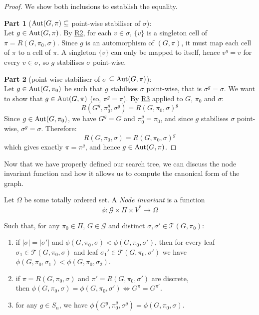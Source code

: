 \vspace{-0.7em}
  \begin{proof}
    We show both inclusions to establish the equality.

    \textbf{Part 1} ($\operatorname{Aut}(G, \pi) \subseteq$ point-wise stabiliser of $\sigma$):\\
    Let $g \in \operatorname{Aut}(G, \pi)$. By \hyperref[RefinementRule:singleton]{R2}, for each $v \in \sigma$, $\{v\}$ is a singleton
    cell of $\pi = R(G, \pi_0, \sigma)$. Since $g$ is an automorphism of $(G, \pi)$, it must
    map each cell of $\pi$ to a cell of $\pi$. A singleton $\{v\}$ can only be mapped to
    itself, hence $v^g = v$ for every $v \in \sigma$, so $g$ stabilises $\sigma$ point-wise.
    
    \textbf{Part 2} (point-wise stabiliser of $\sigma$ $\subseteq \operatorname{Aut}(G, \pi)$):\\
    Let $g \in \operatorname{Aut}(G, \pi_0)$ be such that $g$ stabilises $\sigma$ point-wise, that is
    $\sigma^g = \sigma$. We want to show that $g \in \operatorname{Aut}(G, \pi)$ (so, $\pi^g = \pi$).
    By \hyperref[RefinementRule:equivariance]{R3} applied to $G$, $\pi_0$ and $\sigma$:
    \[R(G^g, \pi_0^g, \sigma^g) = R{(G, \pi_0, \sigma)}^g\]
    Since $g \in \operatorname{Aut}(G, \pi_0)$, we have $G^g = G$ and $\pi_0^g = \pi_0$, and since
    $g$ stabilises $\sigma$ point-wise, $\sigma^g = \sigma$. Therefore:
    \[  R(G, \pi_0, \sigma) = R{(G, \pi_0, \sigma)}^g\]
    which gives exactly $\pi = \pi^g$, and hence $g \in \operatorname{Aut}(G, \pi)$.
    \end{proof}


  Now that we have properly defined our search tree, we can discuss the node invariant function and how it allows us to compute the canonical form of the graph.


\vspace{0.5em} 
\begin{definition}\label{def: node variant}
  Let $\Omega$ be some totally ordered set. A \emph{Node invariant} is a function
  \[\phi : \mathcal{G} \times \Pi \times V^* \to \Omega\]

  Such that, for any $\pi_0 \mathrel{\in}\Pi$, $G \mathrel{\in}\mathcal{G}$ and distinct $\sigma, \sigma' \mathrel{\in}\mathcal{T} (G, \pi_0)$:


  \begin{enumerate}[label=\textit{$\phi$\arabic*.}]
      \item if $|\sigma| = |\sigma'|$ and $\phi(G,\pi_0, \sigma) < \phi(G,\pi_0, \sigma')$, then for every leaf $\sigma_1 \mathrel{\in}\mathcal{T} (G,\pi_0, \sigma)$ and leaf $\sigma_1' \mathrel{\in}\mathcal{T} (G,\pi_0, \sigma')$ we have $\phi(G,\pi_0, \sigma_1) < \phi(G,\pi_0, \sigma_2)$.
      \item if $\pi= R (G,\pi_0, \sigma)$ and $\pi' = R (G,\pi_0, \sigma')$ are discrete,\\
then $\phi(G,\pi_0, \sigma) = \phi(G,\pi_0, \sigma') \mathrel{\Leftrightarrow} G^\pi= G^{\pi'}$.
      \item for any $g \mathrel{\in}S_n$, we have $\phi(G^g,\pi_0^g, \sigma^g) = \phi(G,\pi_0, \sigma)$.
  \end{enumerate}
\end{definition}

